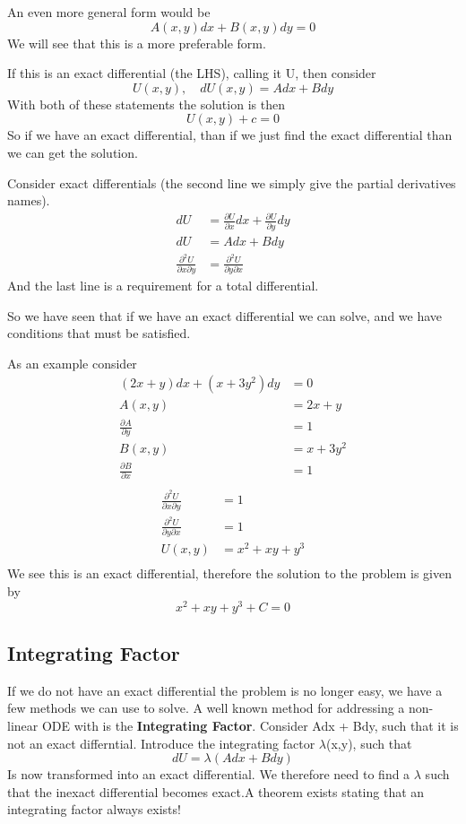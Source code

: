 \documentclass{article}
\newcommand{\be}{\begin{equation}}
\newcommand{\ee}{\end{equation}}
\newcommand{\pd}{\partial}
\begin{document}
An even more general form would be
\be
A(x,y)dx + B(x,y)dy = 0
\ee
We will see that this is a more preferable form.

If this is an exact differential (the LHS), calling it U, then consider
\be
U(x,y), \quad dU(x,y) = Adx + Bdy
\ee
With both of these statements the solution is then
\be
U(x,y) + c = 0
\ee
So if we have an exact differential, than if we just find the exact differential than we can get the solution.

Consider exact differentials (the second line we simply give the partial derivatives names).
\be
\begin{split}
    dU &= \frac{\pd U}{\pd x} dx + \frac{\pd U}{\pd y} dy \\
    dU &= A dx + B dy \\
    \frac{\pd ^2 U}{\pd x \pd y} &= \frac{\pd ^2 U}{\pd y \pd x}
\end{split}
\ee
And the last line is a requirement for a total differential.

So we have seen that if we have an exact differential we can solve, and we have conditions that must be satisfied.

As an example consider
\be
\begin{split}
(2x+y)dx + (x+3y^2)dy &= 0 \\
A(x,y) & = 2x+y  \\
\frac{\partial A}{\partial y} &= 1 \\
B(x,y) & = x+ 3y^2  \\
\frac{\partial B}{\partial x} &= 1 \\
\end{split}
\ee
\be
\begin{split}
    \frac{\pd ^2 U}{\pd x \pd y} &= 1\\
    \frac{\pd ^2 U}{\pd y \pd x} &= 1\\
    U(x,y) &= x^2 + xy + y^3\\
\end{split}
\ee
We see this is an exact differential, therefore the solution to the problem is given  by
\be
x^2 + xy + y^3 + C = 0
\ee
\subsection*{Integrating Factor}
If we do not have an exact differential the problem is no longer easy, we have a few methods we can use to solve.
A well known method for addressing a non-linear ODE with is the \textbf{Integrating Factor}.
Consider Adx + Bdy, such that it is not an exact differntial.
Introduce the integrating factor $\lambda$(x,y), such that
\be
dU = \lambda(Adx + Bdy)
\ee
Is now transformed into an exact differential.
We therefore need to find a $\lambda$ such that the inexact differential becomes exact.A theorem exists stating that an integrating factor always exists!
\end{document}
